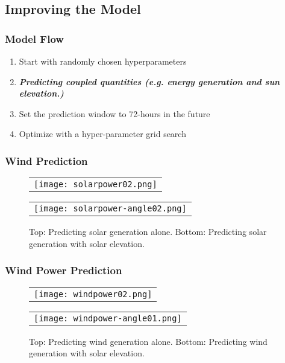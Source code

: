 \subsection{Improving the Model}
\begin{frame}
  \frametitle{Model Flow}
  \begin{enumerate}
    \item Start with randomly chosen hyperparameters
    \item \textbf{\textit{Predicting coupled quantities (e.g. energy generation and sun elevation.)}}
    \item Set the prediction window to 72-hours in the future
    \item Optimize with a hyper-parameter grid search
  \end{enumerate}
\end{frame}

\begin{frame}
  \frametitle{Wind Prediction}
  \begin{figure}
  \centering
  \begin{tabular}{@{}c@{}}
    \texttt{[image: solarpower02.png]}
  \end{tabular}

  \begin{tabular}{@{}c@{}}
    \texttt{[image: solarpower-angle02.png]}
  \end{tabular}

  \caption{Top: Predicting solar generation alone. Bottom: Predicting solar generation with solar elevation.}\label{fig:myfig}
\end{figure}
\end{frame}

\begin{frame}
  \frametitle{Wind Power Prediction}
  \begin{figure}
  \centering
  \begin{tabular}{@{}c@{}}
    \texttt{[image: windpower02.png]}
  \end{tabular}

  \begin{tabular}{@{}c@{}}
    \texttt{[image: windpower-angle01.png]}
  \end{tabular}

  \caption{Top: Predicting wind generation alone. Bottom: Predicting wind generation with solar elevation.}\label{fig:myfig}
\end{figure}
\end{frame}

